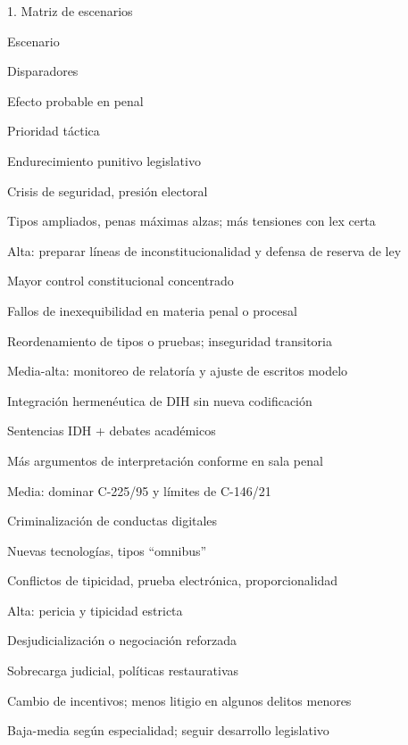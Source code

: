 \documentclass[11pt,a4paper]{article}
\begin{document}
      1. Matriz de escenarios\par




            Escenario\par
            Disparadores\par
            Efecto probable en penal\par
            Prioridad táctica\par






            Endurecimiento punitivo legislativo\par
            Crisis de seguridad, presión electoral\par
            Tipos ampliados, penas máximas alzas; más tensiones con lex certa\par
            Alta: preparar líneas de inconstitucionalidad y defensa de reserva de ley\par



            Mayor control constitucional concentrado\par
            Fallos de inexequibilidad en materia penal o procesal\par
            Reordenamiento de tipos o pruebas; inseguridad transitoria\par
            Media-alta: monitoreo de relatoría y ajuste de escritos modelo\par



            Integración hermenéutica de DIH sin nueva codificación\par
            Sentencias IDH + debates académicos\par
            Más argumentos de interpretación conforme en sala penal\par
            Media: dominar C-225/95 y límites de C-146/21\par



            Criminalización de conductas digitales\par
            Nuevas tecnologías, tipos “omnibus”\par
            Conflictos de tipicidad, prueba electrónica, proporcionalidad\par
            Alta: pericia y tipicidad estricta\par



            Desjudicialización o negociación reforzada\par
            Sobrecarga judicial, políticas restaurativas\par
            Cambio de incentivos; menos litigio en algunos delitos menores\par
            Baja-media según especialidad; seguir desarrollo legislativo\par
\end{document}
